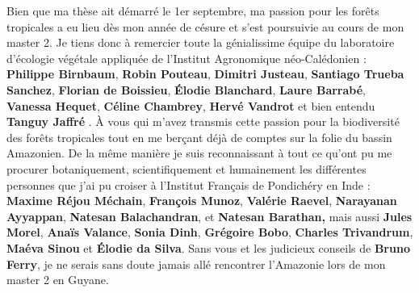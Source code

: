 \documentclass[12pt,twoside,a4paper, a]{article}
\begin{document}
Bien que ma thèse ait démarré le 1er septembre, ma passion pour les
forêts tropicales a eu lieu dès mon année de césure et s'est poursuivie
au cours de mon master 2. Je tiens donc à remercier toute la
génialissime équipe du laboratoire d'écologie végétale appliquée de
l'Institut Agronomique néo-Calédonien : \textbf{Philippe Birnbaum}, \textbf{Robin
Pouteau}, \textbf{Dimitri Justeau}, \textbf{Santiago Trueba Sanchez}, \textbf{Florian
de Boissieu}, \textbf{Élodie Blanchard}, \textbf{Laure Barrabé}, \textbf{Vanessa
Hequet}, \textbf{Céline Chambrey}, \textbf{Hervé Vandrot} et bien entendu
\textbf{Tanguy Jaffré} . À vous qui m'avez transmis cette passion pour la
biodiversité des forêts tropicales tout en me berçant déjà de comptes
sur la folie du bassin Amazonien. De la même manière je suis
reconnaissant à tout ce qu'ont pu me procurer botaniquement,
scientifiquement et humainement les différentes personnes que j'ai pu
croiser à l'Institut Français de Pondichéry en Inde : \textbf{Maxime Réjou
Méchain}, \textbf{François Munoz}, \textbf{Valérie Raevel}, \textbf{Narayanan
Ayyappan}, \textbf{Natesan Balachandran}, et \textbf{Natesan Barathan,} mais
aussi \textbf{Jules Morel}, \textbf{Anaïs Valance}, \textbf{Sonia Dinh}, \textbf{Grégoire
Bobo}, \textbf{Charles Trivandrum}, \textbf{Maéva Sinou} et \textbf{Élodie da Silva}.
Sans vous et les judicieux conseils de \textbf{Bruno Ferry}, je ne serais
sans doute jamais allé rencontrer l'Amazonie lors de mon master 2 en
Guyane.
\end{document}
